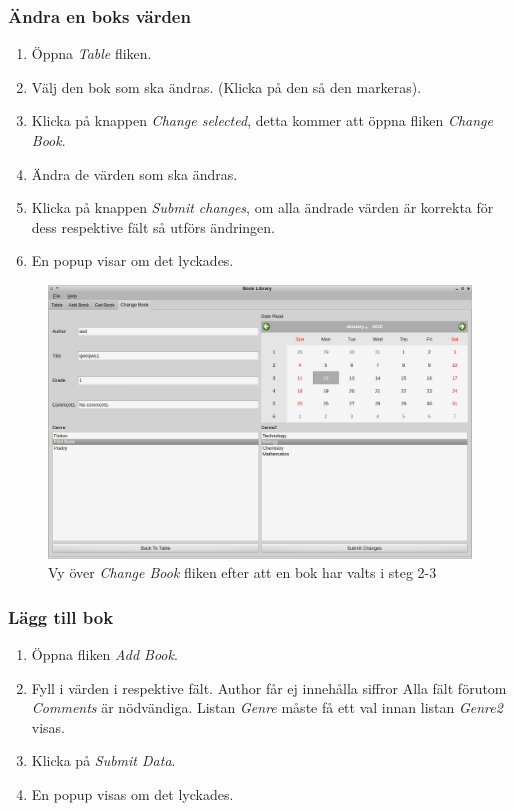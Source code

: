 \documentclass[11pt, titlepage, oneside, a4paper]{article}
\newcommand{\Subsubsection}[1]{\vspace{-4pt}\subsubsection{#1}\vspace{-8pt}}
\begin{document}
		\Subsubsection{Ändra en boks värden}
        \begin{enumerate}
        \item Öppna \emph{Table} fliken.
        \item Välj den bok som ska ändras. (Klicka på den så den markeras).
        \item Klicka på knappen \emph{Change selected}, detta kommer att öppna fliken \emph{Change Book}.
        \item Ändra de värden som ska ändras.
        \item Klicka på knappen \emph{Submit changes}, om alla ändrade värden är korrekta för dess respektive fält så utförs ändringen.
        \item En popup visar om det lyckades. 
		\end{enumerate}
        
        \begin{figure}[h!]
        \includegraphics[width=1\textwidth]{change_book}
        \caption{Vy över \emph{Change Book} fliken efter att en bok har valts i steg 2-3}
        \label{fig:change_book}
        \end{figure}
        
        \newpage
        
        \Subsubsection{Lägg till bok}
        \begin{enumerate}
		\item Öppna fliken \emph{Add Book}.
        \item Fyll i värden i respektive fält.
        \subitem Author får ej innehålla siffror
        \subitem Alla fält förutom \emph{Comments} är nödvändiga.
        \subitem Listan \emph{Genre} måste få ett val innan listan \emph{Genre2} visas. 
        \item Klicka på \emph{Submit Data}.
        \item En popup visas om det lyckades.
		\end{enumerate}
        
\end{document}
